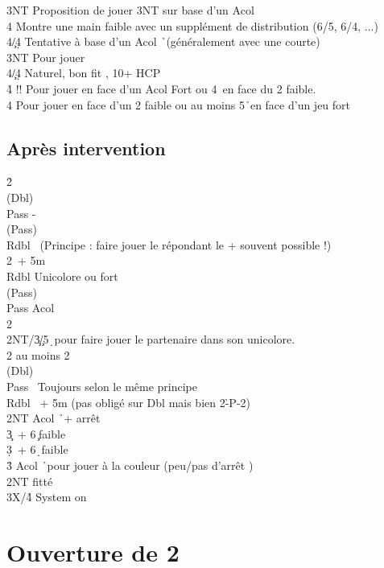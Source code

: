 \documentclass[a4paper]{article}
\begin{document}
\begin{bidtable}
3NT \> Proposition de jouer 3NT sur base d'un Acol \h \\
4\s \> Montre une main faible avec un supplément de distribution (6/5, 6/4, ...)\\
4\c/4\d \> Tentative à base d'un Acol \h\ (généralement avec une courte)\-\\
3NT \> Pour jouer\\
4\c/4\d \> Naturel, bon fit \s , 10+ HCP\\
4\h \> !! Pour jouer en face d'un Acol Fort ou 4\s\ en face du 2 faible.\\
4\s \> Pour jouer en face d'un 2 faible ou au moins 5\h\ en face d'un jeu fort\-
\end{bidtable}

\subsection{Après intervention}

\begin{bidtable}
2\h\+\\
(Dbl)\+\\
Pass - \s \+\\
(Pass)\+\\
Rdbl \s\ (Principe : faire jouer le répondant le + souvent possible !)\\
2\s {}\s\ + 5m\-\-\\
Rdbl \> Unicolore ou fort\+\\
(Pass)\+\\
Pass \> Acol \h \\
2\s {}\s \\
2NT/3\c {}\c /5\d\ pour faire jouer le partenaire dans son unicolore.\-\-\\
2\s \> au moins 2\s \+\\
(Dbl)\+\\
Pass \s\ Toujours selon le même principe\\
Rdbl \s\ + 5m  (pas obligé sur Dbl mais bien 2\h -P-2\s )\\
2NT \> Acol \h\ + arrêt \s \\
3\c {}\s\ + 6\c\ faible\\
3\d {}\s\ + 6\d\ faible\\
3\h \> Acol \h\ pour jouer à la couleur (peu/pas d'arrêt \s )\-\-\\
2NT \> fitté\\
3X/4\h \> System on\-\-
\end{bidtable}

\section{Ouverture de 2\pdfs}
\end{document}
